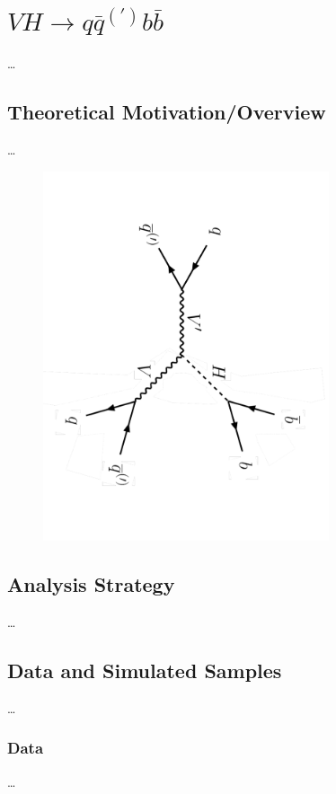 \graphicspath{{Ch5_VHqqbb/figures/}}

\chapter{$VH \rightarrow q\bar{q}^{(\prime)}b\bar{b}$}
\dots

\section{Theoretical Motivation/Overview}
\dots


\begin{figure}
	\centering
	\includegraphics[width=0.75\textwidth,angle=90,origin=c]{feynman_diagram_VHqqbb}
	\caption{}
	\label{fig:feynman_diagram_VHqqbb}
\end{figure}

\section{Analysis Strategy}
\dots

\section{Data and Simulated Samples}
\dots
\subsection{Data}
\dots
